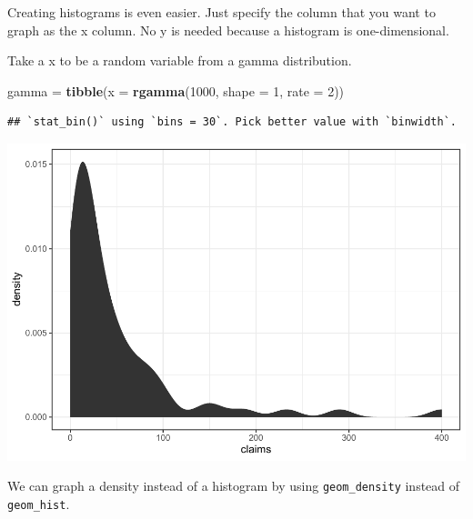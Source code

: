 \documentclass[]{book}
\newenvironment{Shaded}{\begin{snugshade}}{\end{snugshade}}
\newcommand{\DataTypeTok}[1]{\textcolor[rgb]{0.13,0.29,0.53}{#1}}
\newcommand{\DecValTok}[1]{\textcolor[rgb]{0.00,0.00,0.81}{#1}}
\newcommand{\KeywordTok}[1]{\textcolor[rgb]{0.13,0.29,0.53}{\textbf{#1}}}
\newcommand{\NormalTok}[1]{#1}
\newcommand{\OperatorTok}[1]{\textcolor[rgb]{0.81,0.36,0.00}{\textbf{#1}}}
\newcommand{\StringTok}[1]{\textcolor[rgb]{0.31,0.60,0.02}{#1}}
\begin{document}
Creating histograms is even easier. Just specify the column that you want to graph as the x column. No y is needed because a histogram is one-dimensional.

Take a x to be a random variable from a gamma distribution.

\begin{Shaded}
\begin{Highlighting}[]
\NormalTok{gamma =}\StringTok{ }\KeywordTok{tibble}\NormalTok{(}\DataTypeTok{x =} \KeywordTok{rgamma}\NormalTok{(}\DecValTok{1000}\NormalTok{, }\DataTypeTok{shape =} \DecValTok{1}\NormalTok{, }\DataTypeTok{rate =} \DecValTok{2}\NormalTok{))}
\end{Highlighting}
\end{Shaded}

\begin{Shaded}
\end{Shaded}

\begin{verbatim}
## `stat_bin()` using `bins = 30`. Pick better value with `binwidth`.
\end{verbatim}

\includegraphics{Exam-PA-Study-Manual_files/figure-latex/unnamed-chunk-75-1.pdf}

We can graph a density instead of a histogram by using \texttt{geom\_density} instead of \texttt{geom\_hist}.
\end{document}
